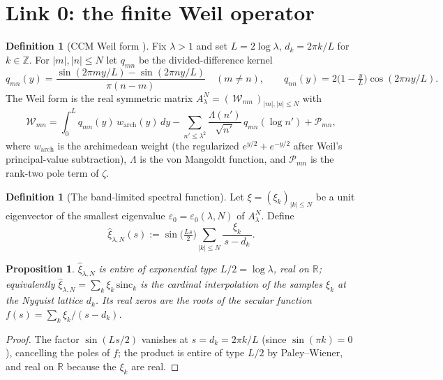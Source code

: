 \documentclass[11pt]{amsart}
\newtheorem{proposition}[theorem]{Proposition}
\theoremstyle{definition}
\newtheorem{definition}[theorem]{Definition}
\theoremstyle{remark}
\newcommand{\bbR}{\mathbb{R}}
\newcommand{\bbZ}{\mathbb{Z}}
\newcommand{\xih}{\widehat{\xi}}
\newcommand{\Lam}{\Lambda}
\begin{document}
\section{Link 0: the finite Weil operator}\label{sec:e0}

\begin{definition}[CCM Weil form {\cite[\S3]{CCM}}]\label{def:weil}
Fix $\lambda>1$ and set $L=2\log\lambda$, $d_k=2\pi k/L$ for
$k\in\bbZ$. For $|m|,|n|\leq N$ let $q_{mn}$ be the divided-difference kernel
\[
q_{mn}(y)=\frac{\sin(2\pi m y/L)-\sin(2\pi n y/L)}{\pi(n-m)}\quad(m\neq n),
\qquad q_{nn}(y)=2\Big(1-\tfrac{y}{L}\Big)\cos(2\pi n y/L).
\]
The Weil form is the real symmetric matrix
$A_\lambda^N=(\,\mathcal{W}_{mn}\,)_{|m|,|n|\leq N}$ with
\begin{equation}\label{eq:weil-entry}
\mathcal{W}_{mn}=\int_0^L q_{mn}(y)\,w_{\mathrm{arch}}(y)\,dy
-\sum_{n'\leq\lambda^2}\frac{\Lam(n')}{\sqrt{n'}}\,q_{mn}(\log n')
+\mathcal{P}_{mn},
\end{equation}
where $w_{\mathrm{arch}}$ is the archimedean weight (the regularized
$e^{y/2}+e^{-y/2}$ after Weil's principal-value subtraction), $\Lam$ is the
von Mangoldt function, and $\mathcal{P}_{mn}$ is the rank-two pole term of
$\zeta$.
\end{definition}

\begin{definition}[The band-limited spectral function]\label{def:xih}
Let $\xi=(\xi_k)_{|k|\leq N}$ be a unit eigenvector of the smallest eigenvalue
$\varepsilon_0=\varepsilon_0(\lambda,N)$ of $A_\lambda^N$. Define
\begin{equation}\label{eq:xih}
\xih_{\lambda,N}(s):=\sin\!\Big(\tfrac{Ls}{2}\Big)\sum_{|k|\leq N}
\frac{\xi_k}{\,s-d_k\,}.
\end{equation}
\end{definition}

\begin{proposition}\label{prop:bandlimited}
$\xih_{\lambda,N}$ is entire of exponential type $L/2=\log\lambda$, real on
$\bbR$; equivalently $\xih_{\lambda,N}=\sum_k\xi_k\,\mathrm{sinc}_k$ is the
cardinal interpolation of the samples $\xi_k$ at the Nyquist lattice $d_k$. Its
real zeros are the roots of the secular function
$f(s)=\sum_k\xi_k/(s-d_k)$.
\end{proposition}
\begin{proof}
The factor $\sin(Ls/2)$ vanishes at $s=d_k=2\pi k/L$ (since
$\sin(\pi k)=0$), cancelling the poles of $f$; the product is entire of type
$L/2$ by Paley--Wiener, and real on $\bbR$ because the $\xi_k$ are real.
\end{proof}
\end{document}
